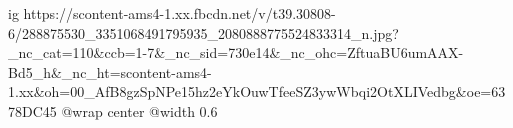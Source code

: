  
 
 
 
 

\ifcmt
  ig https://scontent-ams4-1.xx.fbcdn.net/v/t39.30808-6/288875530_3351068491795935_2080888775524833314_n.jpg?_nc_cat=110&ccb=1-7&_nc_sid=730e14&_nc_ohc=ZftuaBU6umAAX-Bd5_h&_nc_ht=scontent-ams4-1.xx&oh=00_AfB8gzSpNPe15hz2eYkOuwTfeeSZ3ywWbqi2OtXLIVedbg&oe=6378DC45
  @wrap center
  @width 0.6
\fi
